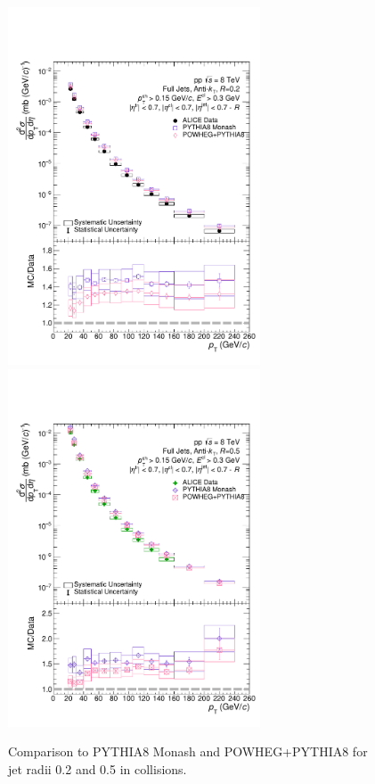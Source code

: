 \begin{figure}
    \centering
    \begin{multicols}{2}
            \includegraphics[width=7.5cm]{figures/MCGen/MCComp_R02_nooutlier.pdf}
        \vfill\null
        \columnbreak
            \includegraphics[width=7.5cm]{figures/MCGen/MCComp_R05_nooutlier.pdf}
        \vfill\null
    \end{multicols}
    \caption{Comparison to PYTHIA8 Monash and POWHEG+PYTHIA8 for jet radii 0.2 and 0.5 in \pp collisions.}
    \label{fig:MCGen}
\end{figure}

